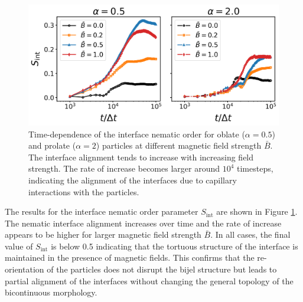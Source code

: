\begin{figure}
\includegraphics[width=\columnwidth]{figures/results/paper1/interface_nematic.png}
\caption{Time-dependence of the interface nematic order for oblate ($\alpha=0.5$) and prolate ($\alpha=2$) particles at different magnetic field strength $\bar{B}$. The interface alignment tends to increase with increasing field strength. The rate of increase becomes larger around $10^4$ timesteps, indicating the alignment of the interfaces due to capillary interactions with the particles.}
\label{fig:interface_nematic}
\end{figure}

The results for the interface nematic order parameter $S_{\text{int}}$
are shown in Figure \ref{fig:interface_nematic}. The nematic interface
alignment increases over time and the rate of increase appears to be
higher for larger magnetic field strength $\bar{B}$. In all cases, the
final value of $S_{\text{int}}$ is below 0.5 indicating that the
tortuous structure of the interface is maintained in the presence of
magnetic fields. This confirms that the re-orientation of the particles
does not disrupt the bijel structure but leads to partial alignment of
the interfaces without changing the general topology of the bicontinuous
morphology.


